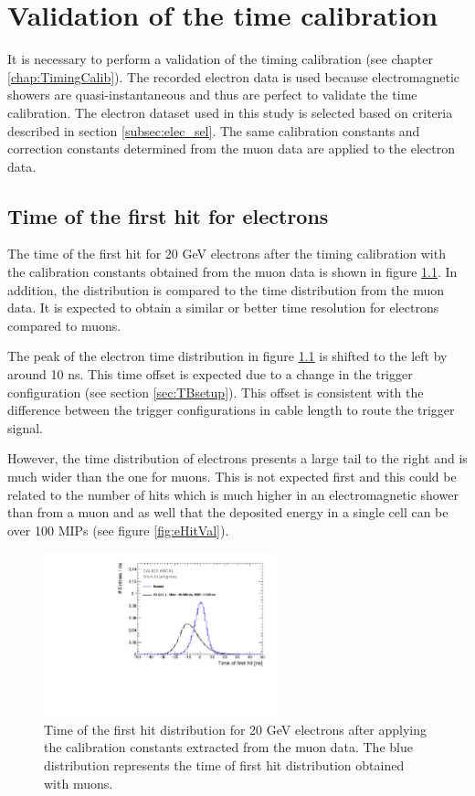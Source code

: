 \chapter{Validation of the time calibration}
\label{chap:TimingValidation}

It is necessary to perform a validation of the timing calibration (see chapter \ref{chap:TimingCalib}). The recorded electron data is used because electromagnetic showers are quasi-instantaneous and thus are perfect to validate the time calibration. The electron dataset used in this study is selected based on criteria described in section \ref{subsec:elec_sel}. The same calibration constants and correction constants determined from the muon data are applied to the electron data.

\section{Time of the first hit for electrons}

The time of the first hit for 20 GeV electrons after the timing calibration with the calibration constants obtained from the muon data is shown in figure \ref{fig:Timing_electrons}. In addition, the distribution is compared to the time distribution from the muon data. It is expected to obtain a similar or better time resolution for electrons compared to muons.

The peak of the electron time distribution in figure \ref{fig:Timing_electrons} is shifted to the left by around 10 ns. This time offset is expected due to a change in the trigger configuration (see section \ref{sec:TBsetup}). This offset is consistent with the difference between the trigger configurations in cable length to route the trigger signal.

However, the time distribution of electrons presents a large tail to the right and is much wider than the one for muons. This is not expected first and this could be related to the number of hits which is much higher in an electromagnetic shower than from a muon and as well that the deposited energy in a single cell can be over 100 MIPs (see figure \ref{fig:eHitVal}).

\begin{figure}[htbp!]
	\centering
	\includegraphics[width=0.6\textwidth]{../Thesis_Plots/Timing/Electrons/Plots/Timing_AllLayers_AfterMuons.pdf}
	\caption{Time of the first hit distribution for 20 GeV electrons after applying the calibration constants extracted from the muon data. The blue distribution represents the time of first hit distribution obtained with muons.}
	\label{fig:Timing_electrons}
\end{figure}

